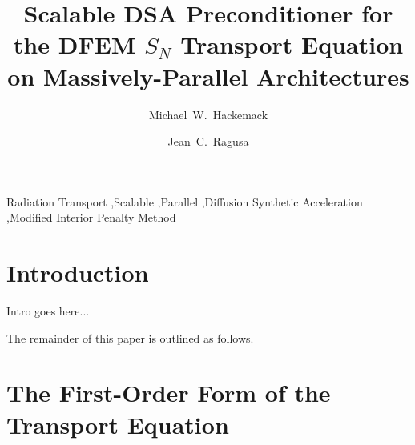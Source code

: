 \documentclass[preprint,review,12pt]{elsarticle}
\begin{document}
\begin{frontmatter}
\title{Scalable DSA Preconditioner for the DFEM $S_N$ Transport Equation on Massively-Parallel Architectures}
\author[kapl]{Michael~W.~Hackemack}
\author[tamu]{Jean~C.~Ragusa}
\address[kapl]{Knolls Atomic Power Laboratory, P.O. Box 1072, Schenectady, NY 12301}
\address[tamu]{Department of Nuclear Engineering, Texas A\&M University, College Station, TX 77843, USA}
\begin{abstract}

\end{abstract}
\begin{keyword}
Radiation Transport \sep Scalable \sep Parallel \sep Diffusion Synthetic Acceleration \sep Modified Interior Penalty Method
\end{keyword}
\end{frontmatter}

\linenumbers

\section{Introduction} \label{sec::intro}

Intro goes here...

The remainder of this paper is outlined as follows. 

\section{The First-Order Form of the Transport Equation} \label{sec::trans}
\end{document}

